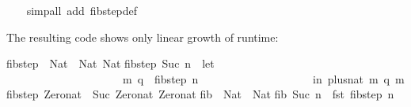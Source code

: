 \begin{isabellebody}
\ \ \isamarkupfalse%
\ {}simp{}all\ add{}\ fib{}step{}def{}%
\endisatagquote
{\isafoldquote}%
%
\isadelimquote
%
\endisadelimquote
%
\begin{isamarkuptext}%
\noindent The resulting code shows only linear growth of runtime:%
\end{isamarkuptext}%
\isamarkuptrue%
%
\isadelimquotetypewriter
%
\endisadelimquotetypewriter
%
\isatagquotetypewriter
%
\begin{isamarkuptext}%
fib{}step\ {}{}\ Nat\ {}{}\ {}Nat{}\ Nat{}{}\isanewline
fib{}step\ {}Suc\ n{}\ {}\ let\ {}\isanewline
\ \ \ \ \ \ \ \ \ \ \ \ \ \ \ \ \ \ \ \ \ {}m{}\ q{}\ {}\ fib{}step\ n{}\isanewline
\ \ \ \ \ \ \ \ \ \ \ \ \ \ \ \ \ \ \ {}\ in\ {}plus{}nat\ m\ q{}\ m{}{}\isanewline
fib{}step\ Zero{}nat\ {}\ {}Suc\ Zero{}nat{}\ Zero{}nat{}{}\isanewline
\isanewline
fib\ {}{}\ Nat\ {}{}\ Nat{}\isanewline
fib\ {}Suc\ n{}\ {}\ fst\ {}fib{}step\ n{}{}\isanewline

\end{isamarkuptext}
\end{isabellebody}
